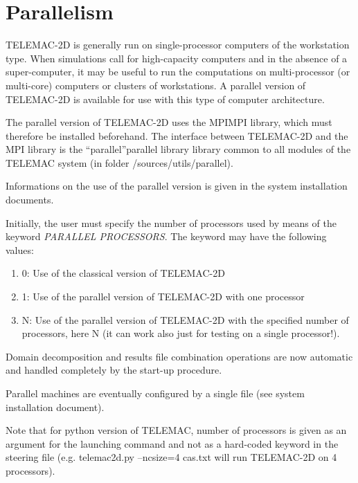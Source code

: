 

\chapter{ Parallelism}

 TELEMAC-2D is generally run on single-processor computers of the workstation type. When simulations call for high-capacity computers and in the absence of a super-computer, it may be useful to run the computations on multi-processor (or multi-core) computers or clusters of workstations. A parallel version of TELEMAC-2D is available for use with this type of computer architecture.

 The parallel version of TELEMAC-2D uses the MPIMPI library, which must therefore be installed beforehand. The interface between TELEMAC-2D and the MPI library is the ``parallel''parallel library library common to all modules of the TELEMAC system (in folder /sources/utils/parallel).

 Informations on the use of the parallel version is given in the system installation documents.

 Initially, the user must specify the number of processors used by means of the keyword \textit{PARALLEL PROCESSORS}. The keyword may have the following values:

\begin{enumerate}
\item [\nonumber] 0: Use of the classical version of TELEMAC-2D

\item [\nonumber] 1: Use of the parallel version of TELEMAC-2D with one processor

\item [\nonumber] N: Use of the parallel version of TELEMAC-2D with the specified number of processors, here N (it can work also just for testing on a single processor!).
\end{enumerate}

 Domain decomposition and results file combination operations are now automatic and handled completely by the start-up procedure.

 Parallel machines are eventually configured by a single file (see system installation document).

 Note that for python version of TELEMAC, number of processors is given as an argument for the launching command and not as a hard-coded keyword in the steering file (e.g. telemac2d.py --ncsize=4 cas.txt will run TELEMAC-2D on 4 processors).







